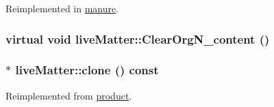 Reimplemented in \hyperlink{classmanure_aad5e7bf3c405be74990b85a5d4fd4b49}{manure}.\hypertarget{classlive_matter_a8a0ba23076e0651521207fdc0cf0e11e}{
\subsubsection[{ClearOrgN\_\-content}]{\setlength{\rightskip}{0pt plus 5cm}virtual void liveMatter::ClearOrgN\_\-content ()}}
\label{classlive_matter_a8a0ba23076e0651521207fdc0cf0e11e}
\hypertarget{classlive_matter_a08101ef64ee3eeec55d222bb75975370}{
\subsubsection[{clone}]{ $\ast$ liveMatter::clone () const}}
\label{classlive_matter_a08101ef64ee3eeec55d222bb75975370}


Reimplemented from \hyperlink{classproduct_a18a1df87f3400774db21d1e8c573f04a}{product}.


